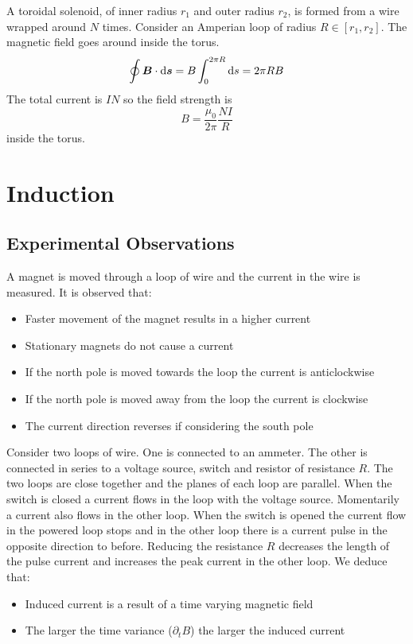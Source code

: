 \documentclass{article}
\begin{document}
    A toroidal solenoid, of inner radius \(r_1\) and outer radius \(r_2\), is formed from a wire wrapped around \(N\) times.
    Consider an Amperian loop of radius \(R\in[r_1, r_2]\).
    The magnetic field goes around inside the torus.
    \[\oint\bm{B}\cdot\dd\bm{s} = B\int_0^{2\pi R}\dd s = 2\pi RB\]
    The total current is \(IN\) so the field strength is
    \[B = \frac{\mu_0}{2\pi}\frac{NI}{R}\]
    inside the torus.
    
    \section{Induction}
    \subsection{Experimental Observations}
    A magnet is moved through a loop of wire and the current in the wire is measured.
    It is observed that:
    \begin{itemize}
        \item Faster movement of the magnet results in a higher current
        \item Stationary magnets do not cause a current
        \item If the north pole is moved towards the loop the current is anticlockwise
        \item If the north pole is moved away from the loop the current is clockwise
        \item The current direction reverses if considering the south pole
    \end{itemize}
    Consider two loops of wire.
    One is connected to an ammeter.
    The other is connected in series to a voltage source, switch and resistor of resistance \(R\).
    The two loops are close together and the planes of each loop are parallel.
    When the switch is closed a current flows in the loop with the voltage source.
    Momentarily a current also flows in the other loop.
    When the switch is opened the current flow in the powered loop stops and in the other loop there is a current pulse in the opposite direction to before.
    Reducing the resistance \(R\) decreases the length of the pulse current and increases the peak current in the other loop.
    We deduce that:
    \begin{itemize}
        \item Induced current is a result of a time varying magnetic field
        \item The larger the time variance (\(\partial_t B\)) the larger the induced current
    \end{itemize}
\end{document}
